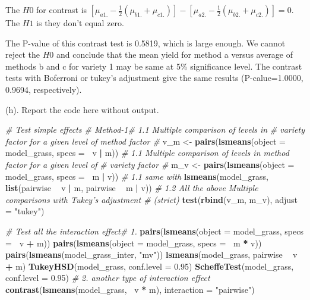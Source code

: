 \documentclass[]{article}
\newenvironment{Shaded}{\begin{snugshade}}{\end{snugshade}}
\newcommand{\CommentTok}[1]{\textcolor[rgb]{0.56,0.35,0.01}{\textit{#1}}}
\newcommand{\DataTypeTok}[1]{\textcolor[rgb]{0.13,0.29,0.53}{#1}}
\newcommand{\FloatTok}[1]{\textcolor[rgb]{0.00,0.00,0.81}{#1}}
\newcommand{\KeywordTok}[1]{\textcolor[rgb]{0.13,0.29,0.53}{\textbf{#1}}}
\newcommand{\NormalTok}[1]{#1}
\newcommand{\OperatorTok}[1]{\textcolor[rgb]{0.81,0.36,0.00}{\textbf{#1}}}
\newcommand{\StringTok}[1]{\textcolor[rgb]{0.31,0.60,0.02}{#1}}
\begin{document}
The \(H0\) for contrast is
\([\mu_{a1.}-\frac12(\mu_{b1.}+\mu_{c1.})]-[\mu_{a2.}-\frac12(\mu_{b2.}+\mu_{c2.})]=0\).
The \(H1\) is they don't equal zero.

The P-value of this contrast test is 0.5819, which is large enough. We
cannot reject the \(H0\) and conclude that the mean yield for method a
versus average of methods b and c for variety 1 may be same at 5\%
significance level. The contrast tests with Boferroni or tukey's
adjustment give the same results (P-calue=1.0000, 0.9694, respectively).

(h). \textcolor[rgb]{0.5,0.5,0.5}{Report the code here without output.}

\begin{Shaded}
\begin{Highlighting}[]
\CommentTok{# Test simple effects # Method-1# 1.1 Multiple comparison of levels in}
\CommentTok{# variety factor for a given level of method factor #}
\NormalTok{v_m <-}\StringTok{ }\KeywordTok{pairs}\NormalTok{(}\KeywordTok{lsmeans}\NormalTok{(}\DataTypeTok{object =}\NormalTok{ model_grass, }\DataTypeTok{specs =} \OperatorTok{~}\NormalTok{v }\OperatorTok{|}\StringTok{ }\NormalTok{m))}
\CommentTok{# 1.1 Multiple comparison of levels in method factor for a given level of}
\CommentTok{# variety factor #}
\NormalTok{m_v <-}\StringTok{ }\KeywordTok{pairs}\NormalTok{(}\KeywordTok{lsmeans}\NormalTok{(}\DataTypeTok{object =}\NormalTok{ model_grass, }\DataTypeTok{specs =} \OperatorTok{~}\NormalTok{m }\OperatorTok{|}\StringTok{ }\NormalTok{v))}
\CommentTok{# 1.1 same with}
\KeywordTok{lsmeans}\NormalTok{(model_grass, }\KeywordTok{list}\NormalTok{(pairwise }\OperatorTok{~}\StringTok{ }\NormalTok{v }\OperatorTok{|}\StringTok{ }\NormalTok{m, pairwise }\OperatorTok{~}\StringTok{ }\NormalTok{m }\OperatorTok{|}\StringTok{ }\NormalTok{v))}
\CommentTok{# 1.2 All the above Multiple comparisons with Tukey's adjustment # (strict)}
\KeywordTok{test}\NormalTok{(}\KeywordTok{rbind}\NormalTok{(v_m, m_v), }\DataTypeTok{adjust =} \StringTok{"tukey"}\NormalTok{)}

\CommentTok{# Test all the interaction effect# 1.}
\KeywordTok{pairs}\NormalTok{(}\KeywordTok{lsmeans}\NormalTok{(}\DataTypeTok{object =}\NormalTok{ model_grass, }\DataTypeTok{specs =} \OperatorTok{~}\NormalTok{v }\OperatorTok{+}\StringTok{ }\NormalTok{m))}
\KeywordTok{pairs}\NormalTok{(}\KeywordTok{lsmeans}\NormalTok{(}\DataTypeTok{object =}\NormalTok{ model_grass, }\DataTypeTok{specs =} \OperatorTok{~}\NormalTok{m }\OperatorTok{*}\StringTok{ }\NormalTok{v))}
\KeywordTok{pairs}\NormalTok{(}\KeywordTok{lsmeans}\NormalTok{(model_grass_inter, }\StringTok{"mv"}\NormalTok{))}
\KeywordTok{lsmeans}\NormalTok{(model_grass, pairwise }\OperatorTok{~}\StringTok{ }\NormalTok{v }\OperatorTok{+}\StringTok{ }\NormalTok{m)}
\KeywordTok{TukeyHSD}\NormalTok{(model_grass, }\DataTypeTok{conf.level =} \FloatTok{0.95}\NormalTok{)}
\KeywordTok{ScheffeTest}\NormalTok{(model_grass, }\DataTypeTok{conf.level =} \FloatTok{0.95}\NormalTok{)}
\CommentTok{# 2. another type of interaction effect}
\KeywordTok{contrast}\NormalTok{(}\KeywordTok{lsmeans}\NormalTok{(model_grass, }\OperatorTok{~}\NormalTok{v }\OperatorTok{*}\StringTok{ }\NormalTok{m), }\DataTypeTok{interaction =} \StringTok{"pairwise"}\NormalTok{)}


\end{Highlighting}
\end{Shaded}
\end{document}
